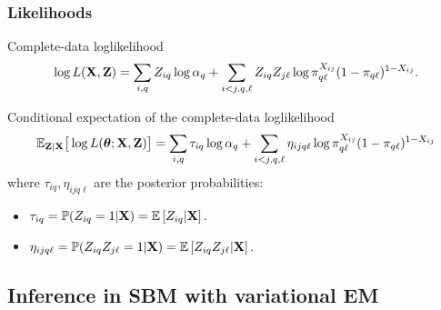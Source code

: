 \documentclass{beamer}\usepackage[]{graphicx}\usepackage[]{color}
\begin{document}
\begin{frame}
  \frametitle{Likelihoods}

  \begin{block}{Complete-data loglikelihood}
    \vspace{-.5cm}
    \begin{equation*}
      \log L(\mathbf{X},\mathbf{Z}) = \sum_{i,q} Z_{iq} \log \alpha_q + \sum_{i<j,q,\ell} Z_{iq}Z_{j\ell} \log \pi_{q\ell}^{X_{ij}} (1-\pi_{q\ell})^{1-X_{ij}}.
    \end{equation*}
  \end{block}

  \begin{block}{Conditional expectation of the complete-data loglikelihood}
    \vspace{-.5cm}
    \begin{equation*}
      \mathbb{E}_{\mathbf{Z}|\mathbf{X}} \big[\log L(\boldsymbol\theta;\mathbf{X},\mathbf{Z}) \big] = \sum_{i,q} \tau_{iq} \log \alpha_q + \sum_{i<j,q,\ell} \eta_{ijq\ell} \log \pi_{q\ell}^{X_{ij}} (1-\pi_{q\ell})^{1-X_{ij}}
    \end{equation*}
      where $\tau_ {iq}, \eta_{ijq\ell}$ are the posterior probabilities:
      \begin{itemize}
        \item $\tau_{iq} = \mathbb{P}(Z_{iq} = 1 | \mathbf{X}) = \mathbb{E} \left[Z_{iq} | \mathbf{X}\right].$
        \item $\eta_{ijq\ell} = \mathbb{P}(Z_{iq}Z_{j\ell} = 1 | \mathbf{X}) = \mathbb{E} \left[Z_{iq}Z_{j\ell} | \mathbf{X}\right].$
      \end{itemize}
  \end{block}

\end{frame}

\subsection{Inference in SBM with variational EM}
\end{document}
